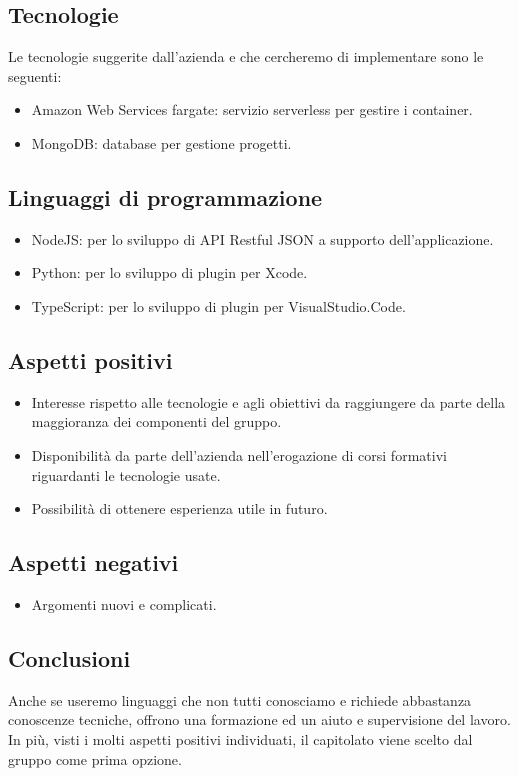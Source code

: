 \documentclass{article}
\begin{document}
\subsection{Tecnologie}
Le tecnologie suggerite dall’azienda e che cercheremo di implementare sono le seguenti:
\begin{itemize}
    \item Amazon Web Services fargate: servizio serverless per gestire i container.
    \item MongoDB: database per gestione progetti.
\end{itemize}
\subsection{Linguaggi di programmazione}
\begin{itemize}
    \item NodeJS: per lo sviluppo di API Restful JSON a supporto dell’applicazione.
    \item Python: per lo sviluppo di plugin per Xcode.
    \item TypeScript: per lo sviluppo di plugin per VisualStudio.Code.
\end{itemize}
\subsection{Aspetti positivi}
\begin{itemize}
    \item Interesse rispetto alle tecnologie e agli obiettivi da raggiungere da parte della maggioranza dei componenti del gruppo.
    \item Disponibilità da parte dell’azienda nell’erogazione di corsi formativi riguardanti le tecnologie usate.
    \item Possibilità di ottenere esperienza utile in futuro.
\end{itemize}
\subsection{Aspetti negativi}
\begin{itemize}
    \item Argomenti nuovi e complicati.
\end{itemize}
\subsection{Conclusioni}
Anche se useremo linguaggi che non tutti conosciamo e richiede abbastanza conoscenze tecniche, offrono una formazione ed un aiuto e supervisione del lavoro. In più, visti i molti aspetti positivi individuati, il capitolato viene scelto dal gruppo come prima opzione.
\end{document}
